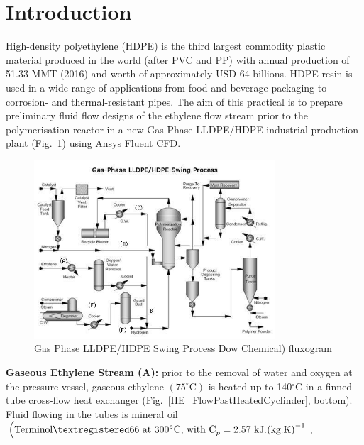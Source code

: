 \documentclass[12pts,a4paper,amsmath,amssymb,floatfix]{article}%
\begin{document}
\section{Introduction}
High-density polyethylene (HDPE) is the third largest commodity plastic material produced in the world (after PVC and PP) with annual production of 51.33 MMT (2016) and worth of approximately USD 64 billions. HDPE resin is used in a wide range of applications from food and beverage packaging to corrosion- and thermal-resistant pipes. The aim of this practical is to prepare preliminary fluid flow designs of the ethylene flow stream prior to the polymerisation reactor in a new Gas Phase LLDPE/HDPE industrial production plant (Fig.~\ref{HDPE_Plant}) using Ansys Fluent CFD.   
 
\begin{figure}[H]
  \begin{center}
     \includegraphics[width=0.8\textwidth,clip]{./Pics/hdpe_production_img2.jpg}
     \caption{Gas Phase LLDPE/HDPE Swing Process Dow Chemical) fluxogram}\label{HDPE_Plant}
  \end{center}
\end{figure}

{\bf Gaseous Ethylene Stream (A):} prior to the removal of water and oxygen at the pressure vessel, gaseous ethylene $\left(\text{75}^{\circ}\text{C}\right)$ is heated up to 140$^{\circ}$C in a finned tube cross-flow heat exchanger (Fig.~\ref{HE_FlowPastHeatedCyclinder}, bottom). Fluid flowing in the tubes is mineral oil $\left(\text{Terminol}\textregistered\text{66 at 300}^{\circ}\text{C, with C}_{p}=2.57\text{ kJ.(kg.K)}^{-1}\right.$, 
\end{document}
